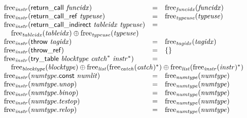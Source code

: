 $$\begin{array}[t]{@{}lcl@{}l@{}}
{\mathrm{free}}_{\mathit{instr}}(\mathsf{return\_call}~{\mathit{funcidx}}) & = & {\mathrm{free}}_{\mathit{funcidx}}({\mathit{funcidx}}) \\
{\mathrm{free}}_{\mathit{instr}}(\mathsf{return\_call\_ref}~{\mathit{typeuse}}) & = & {\mathrm{free}}_{\mathit{typeuse}}({\mathit{typeuse}}) \\
{\mathrm{free}}_{\mathit{instr}}(\mathsf{return\_call\_indirect}~{\mathit{tableidx}}~{\mathit{typeuse}}) & = & & \\
 \multicolumn{4}{@{}l@{}}{\quad
\begin{array}[t]{@{}l@{}}
{\mathrm{free}}_{\mathit{tableidx}}({\mathit{tableidx}}) \oplus {\mathrm{free}}_{\mathit{typeuse}}({\mathit{typeuse}}) \\
\end{array}
} \\
{\mathrm{free}}_{\mathit{instr}}(\mathsf{throw}~{\mathit{tagidx}}) & = & {\mathrm{free}}_{\mathit{tagidx}}({\mathit{tagidx}}) \\
{\mathrm{free}}_{\mathit{instr}}(\mathsf{throw\_ref}) & = & \{  \} \\
{\mathrm{free}}_{\mathit{instr}}(\mathsf{try\_table}~{\mathit{blocktype}}~{{\mathit{catch}}^\ast}~{{\mathit{instr}}^\ast}) & = & & \\
 \multicolumn{4}{@{}l@{}}{\quad
\begin{array}[t]{@{}l@{}}
{\mathrm{free}}_{\mathit{blocktype}}({\mathit{blocktype}}) \oplus {\mathrm{free}}_{\mathit{list}}({{\mathrm{free}}_{\mathit{catch}}({\mathit{catch}})^\ast}) \oplus {\mathrm{free}}_{\mathit{list}}({{\mathrm{free}}_{\mathit{instr}}({\mathit{instr}})^\ast}) \\
\end{array}
} \\
{\mathrm{free}}_{\mathit{instr}}({\mathit{numtype}}{.}\mathsf{const}~{\mathit{numlit}}) & = & {\mathrm{free}}_{\mathit{numtype}}({\mathit{numtype}}) \\
{\mathrm{free}}_{\mathit{instr}}({\mathit{numtype}} {.} {\mathit{unop}}) & = & {\mathrm{free}}_{\mathit{numtype}}({\mathit{numtype}}) \\
{\mathrm{free}}_{\mathit{instr}}({\mathit{numtype}} {.} {\mathit{binop}}) & = & {\mathrm{free}}_{\mathit{numtype}}({\mathit{numtype}}) \\
{\mathrm{free}}_{\mathit{instr}}({\mathit{numtype}} {.} {\mathit{testop}}) & = & {\mathrm{free}}_{\mathit{numtype}}({\mathit{numtype}}) \\
{\mathrm{free}}_{\mathit{instr}}({\mathit{numtype}} {.} {\mathit{relop}}) & = & {\mathrm{free}}_{\mathit{numtype}}({\mathit{numtype}}) \\

\end{array}$$
